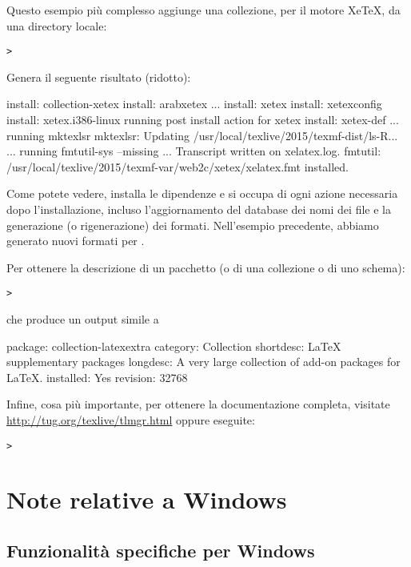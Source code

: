 \documentclass{article}
\begin{document}
Questo esempio più complesso aggiunge una collezione, per il motore
Xe\TeX, da una directory locale:

\begin{alltt}
> 
\end{alltt}
Genera il seguente risultato (ridotto):
\begin{fverbatim}
install: collection-xetex
install: arabxetex
...
install: xetex
install: xetexconfig
install: xetex.i386-linux
running post install action for xetex
install: xetex-def
...
running mktexlsr
mktexlsr: Updating /usr/local/texlive/2015/texmf-dist/ls-R...
...
running fmtutil-sys --missing
...
Transcript written on xelatex.log.
fmtutil: /usr/local/texlive/2015/texmf-var/web2c/xetex/xelatex.fmt installed.
\end{fverbatim}

Come potete vedere,  installa le dipendenze e si occupa di ogni
azione necessaria dopo l'installazione, incluso l'aggiornamento del
database dei nomi dei file e la generazione (o rigenerazione) dei formati.
Nell'esempio precedente, abbiamo generato nuovi formati per \XeTeX.

Per ottenere la descrizione di un pacchetto (o di una collezione o di uno
schema):
\begin{alltt}
> 
\end{alltt}
che produce un output simile a
\begin{fverbatim}
package:    collection-latexextra
category:   Collection
shortdesc:  LaTeX supplementary packages
longdesc:   A very large collection of add-on packages for LaTeX.
installed:  Yes
revision:   32768
\end{fverbatim}

Infine, cosa più importante, per ottenere la documentazione completa,
visitate \url{http://tug.org/texlive/tlmgr.html} oppure eseguite:
\begin{alltt}
> 
\end{alltt}


\section{Note relative a Windows}
\label{sec:windows}


\subsection{Funzionalità specifiche per Windows}
\label{sec:winfeatures}
\end{document}
